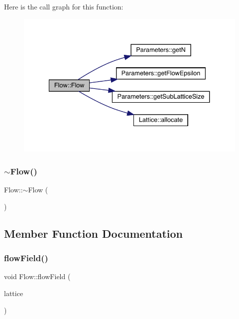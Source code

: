 Here is the call graph for this function\+:\nopagebreak
\begin{figure}[H]
\begin{center}
\leavevmode
\includegraphics[width=334pt]{class_flow_a25ae85599c0ae330374f0840efde7ebc_cgraph}
\end{center}
\end{figure}
\mbox{\label{class_flow_a5991efa6e8cf88c4ef2125cc727db333}} 
\subsubsection{\texorpdfstring{$\sim$Flow()}{~Flow()}}
{\footnotesize\ttfamily Flow\+::$\sim$\+Flow (\begin{DoxyParamCaption}{ }\end{DoxyParamCaption})}



\subsection{Member Function Documentation}
\mbox{\label{class_flow_a284b490ddedc9cf5d0f2ab0660c328f6}} 
\subsubsection{\texorpdfstring{flowField()}{flowField()}}
{\footnotesize\ttfamily void Flow\+::flow\+Field (\begin{DoxyParamCaption}\item[{\mbox{\hyperlink{class_lattice}{Lattice}}$<$ \mbox{\hyperlink{class_s_u3}{S\+U3}} $>$ $\ast$}]{lattice }\end{DoxyParamCaption})}

